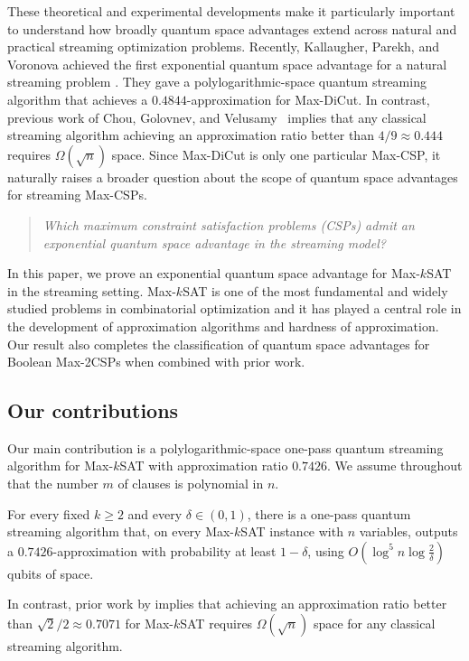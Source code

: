 These theoretical and experimental developments make it particularly important to understand how broadly quantum space advantages extend across natural and practical streaming optimization problems. Recently, Kallaugher, Parekh, and Voronova achieved the first exponential quantum space advantage for a natural streaming problem \cite{KPV23}. They gave a polylogarithmic-space quantum streaming algorithm that achieves a $0.4844$-approximation for Max-DiCut. In contrast, previous work of Chou, Golovnev, and Velusamy~\cite{CGV20} implies that any classical streaming algorithm achieving an approximation ratio better than $4/9 \approx 0.444$ requires $\Omega(\sqrt n)$ space. 
Since Max-DiCut is only one particular Max-CSP, it naturally raises a broader question about the scope of quantum space advantages for streaming Max-CSPs. 
\begin{quote}
\textit{Which maximum constraint satisfaction problems (CSPs) admit an exponential quantum space advantage in the streaming model?}
\end{quote}
In this paper, we prove an exponential quantum space advantage for Max-$k$SAT in the streaming setting.  Max-\(k\)SAT is one of the most fundamental and widely studied problems in combinatorial optimization \cite{PapadimitriouYannakakis1991,Hastad2001OptimalInapproximability} and  it has played a central role in the development of approximation algorithms and hardness of approximation.  Our result also completes the classification of quantum space advantages for Boolean Max-2CSPs when combined with prior work.

\subsection{Our contributions}
Our main contribution is a polylogarithmic-space one-pass quantum streaming algorithm for Max-$k$SAT with approximation ratio $0.7426$.
We assume throughout that the number $m$ of clauses is polynomial in $n$.
\begin{theorem} \label{thm:main}
For every fixed $k\ge 2$ and every $\delta\in(0,1)$, there is a one-pass quantum streaming algorithm that, on every Max-$k$SAT instance with $n$ variables, outputs a $0.7426$-approximation with probability at least $1-\delta$, using $O\!\left(\log^5 n \log\frac{2}{\delta}\right)$ qubits of space.
\end{theorem}
In contrast, prior work by \cite{CGV20} implies that achieving an approximation ratio better than $\sqrt{2}/2 \approx 0.7071$ for Max-$k$SAT requires $\Omega(\sqrt{n})$ space for any classical streaming algorithm.  

